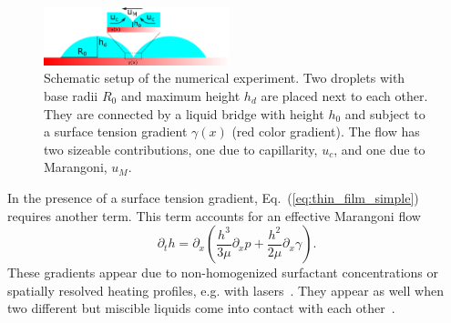 \documentclass[twocolumn,amsmath,amssymb,showpacs,nofootinbib,prfluids,superscriptaddress]{revtex4-2} %
\begin{document}
\begin{figure}
    \centering
    \includegraphics[width=0.48\textwidth]{Figures/setup.png}
    \caption{Schematic setup of the numerical experiment. 
    Two droplets with base radii $R_0$ and maximum height $h_d$ are placed next to each other. 
    They are connected by a liquid bridge with height $h_0$ and subject to a surface tension gradient $\gamma(x)$ (red color gradient).
    The flow has two sizeable contributions, one due to capillarity, $u_c$, and one due to Marangoni, $u_M$.
    }
    \label{fig:schematics}
\end{figure}
In the presence of a surface tension gradient, Eq.~(\ref{eq:thin_film_simple}) requires another term.
This term accounts for an effective Marangoni flow~\cite{doi:10.1021/la500459v, karpitschka2014sharp, bestehorn20033d, doi:10.1021/la960488a}
\begin{equation}\label{eq:thin_with_marangoni}
    \partial_t h = \partial_x \left(\frac{h^3}{3\mu}\partial_x p + \frac{h^2}{2\mu}\partial_x\gamma\right).
\end{equation}
These gradients appear due to non-homogenized surfactant concentrations or spatially resolved heating profiles, e.g. with lasers~\cite{doi:10.1021/la960488a, NIKOLOV2002325, bruning2018delayed, wedershoven2014infrared}. 
They appear as well when two different but miscible liquids come into contact with each other~\cite{doi:10.1021/la800630w, karpitschka2014sharp, doi:10.1021/la500459v}. 
\end{document}
